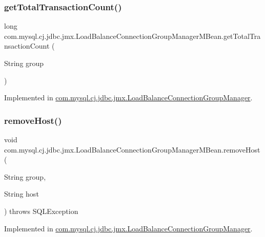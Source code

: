 \subsubsection{\texorpdfstring{get\+Total\+Transaction\+Count()}{getTotalTransactionCount()}}
{\footnotesize\ttfamily long com.\+mysql.\+cj.\+jdbc.\+jmx.\+Load\+Balance\+Connection\+Group\+Manager\+M\+Bean.\+get\+Total\+Transaction\+Count (\begin{DoxyParamCaption}\item[{String}]{group }\end{DoxyParamCaption})}



Implemented in \mbox{\hyperlink{classcom_1_1mysql_1_1cj_1_1jdbc_1_1jmx_1_1_load_balance_connection_group_manager_a326883b94b5b7d63d55dbfd1db697d6d}{com.\+mysql.\+cj.\+jdbc.\+jmx.\+Load\+Balance\+Connection\+Group\+Manager}}.

\mbox{\label{interfacecom_1_1mysql_1_1cj_1_1jdbc_1_1jmx_1_1_load_balance_connection_group_manager_m_bean_a62791f1b8cf09bff2624d9706d385d1a}} 
\subsubsection{\texorpdfstring{remove\+Host()}{removeHost()}}
{\footnotesize\ttfamily void com.\+mysql.\+cj.\+jdbc.\+jmx.\+Load\+Balance\+Connection\+Group\+Manager\+M\+Bean.\+remove\+Host (\begin{DoxyParamCaption}\item[{String}]{group,  }\item[{String}]{host }\end{DoxyParamCaption}) throws S\+Q\+L\+Exception}



Implemented in \mbox{\hyperlink{classcom_1_1mysql_1_1cj_1_1jdbc_1_1jmx_1_1_load_balance_connection_group_manager_ae28d9729a8c6bd064b97973376398d92}{com.\+mysql.\+cj.\+jdbc.\+jmx.\+Load\+Balance\+Connection\+Group\+Manager}}.

